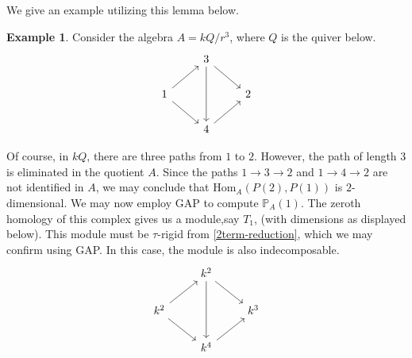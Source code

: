 \documentclass[]{article}
\theoremstyle{definition}
\newtheorem{example}{Example}[section]
\newcommand{\tu}{\ensuremath{\tau}}
\begin{document}
We give an example utilizing this lemma below.

\begin{example}
	Consider the algebra $A = kQ/r^3$, where $Q$ is the quiver below.
	\[\begin{tikzcd}
		& 3 \\
		1 && 2 \\
		& 4
		\arrow[from=2-1, to=1-2]
		\arrow[from=2-1, to=3-2]
		\arrow[from=3-2, to=2-3]
		\arrow[from=1-2, to=2-3]
		\arrow[from=1-2, to=3-2]
	\end{tikzcd}\]

	Of course, in $kQ$, there are three paths from $1$ to $2$. However, the path of length $3$ is eliminated in the quotient $A$. Since the paths $1 \to 3 \to 2$ and $1 \to 4 \to 2$ are not identified in $A$, we may conclude that $\text{Hom}_A(P(2),P(1))$ is $2$-dimensional. We may now employ GAP to compute $\mathbb{P}_A(1)$. The zeroth homology of this complex gives us a module,say $T_1$, (with dimensions as displayed below). This module must be \tu-rigid from \cref{2term-reduction}, which we may confirm using GAP. In this case, the module is also indecomposable.
	\[\begin{tikzcd}
		& k^2 \\
		k^2 && k^3 \\
		& k^4
		\arrow[from=2-1, to=1-2]
		\arrow[from=2-1, to=3-2]
		\arrow[from=3-2, to=2-3]
		\arrow[from=1-2, to=2-3]
		\arrow[from=1-2, to=3-2]
	\end{tikzcd}\]


\end{example}
\end{document}
